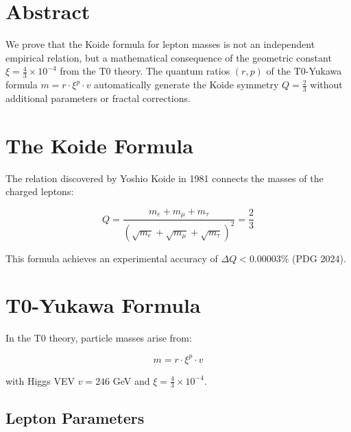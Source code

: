 \section*{Abstract}
		We prove that the Koide formula for lepton masses is not an independent empirical relation, but a mathematical consequence of the geometric constant $\xi = \frac{4}{3} \times 10^{-4}$ from the T0 theory. The quantum ratios $(r,p)$ of the T0-Yukawa formula $m = r \cdot \xi^p \cdot v$ automatically generate the Koide symmetry $Q = \frac{2}{3}$ without additional parameters or fractal corrections.

	
	\section{The Koide Formula}
	
	The relation discovered by Yoshio Koide in 1981 connects the masses of the charged leptons:
	
	\begin{equation}
		Q = \frac{m_e + m_\mu + m_\tau}{\left( \sqrt{m_e} + \sqrt{m_\mu} + \sqrt{m_\tau} \right)^2} = \frac{2}{3}
		\label{eq:koide}
	\end{equation}
	
	This formula achieves an experimental accuracy of $\Delta Q < 0.00003\%$ (PDG 2024).
	
	\section{T0-Yukawa Formula}
	
	In the T0 theory, particle masses arise from:
	
	\begin{equation}
		m = r \cdot \xi^p \cdot v
		\label{eq:t0yukawa}
	\end{equation}
	
	with Higgs VEV $v = 246$ GeV and $\xi = \frac{4}{3} \times 10^{-4}$.
	
	\subsection{Lepton Parameters}
	
	\begin{table}[h]
		\centering
		\caption{T0 Quantum Ratios of the Charged Leptons}
	\end{table}
	
